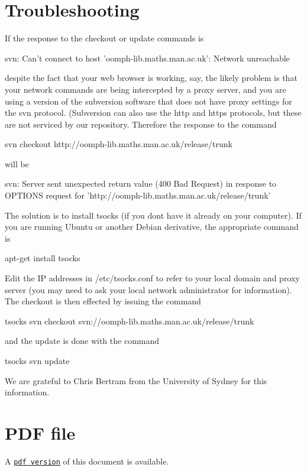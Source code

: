  \hypertarget{index_problems}{}\section{Troubleshooting}\label{index_problems}
If the response to the checkout or update commands is 
\begin{DoxyCode}
svn: Can\textcolor{stringliteral}{'t connect to host '}oomph-lib.maths.man.ac.uk\textcolor{stringliteral}{': Network unreachable}
\end{DoxyCode}
 despite the fact that your web browser is working, say, the likely problem is that your network commands are being intercepted by a proxy server, and you are using a version of the subversion software that does not have proxy settings for the svn protocol. (Subversion can also use the http and https protocols, but these are not serviced by our repository. Therefore the response to the command 
\begin{DoxyCode}
svn checkout http:\textcolor{comment}{//oomph-lib.maths.man.ac.uk/release/trunk }
\end{DoxyCode}
 will be 
\begin{DoxyCode}
svn: Server sent unexpected \textcolor{keywordflow}{return} value (400 Bad Request) in response to OPTIONS request
\textcolor{keywordflow}{for} \textcolor{stringliteral}{'http://oomph-lib.maths.man.ac.uk/release/trunk'}
\end{DoxyCode}


The solution is to install tsocks (if you don\textquotesingle{}t have it already on your computer). If you are running Ubuntu or another Debian derivative, the appropriate command is 
\begin{DoxyCode}
apt-\textcolor{keyword}{get} install tsocks
\end{DoxyCode}
 Edit the IP addresses in {\ttfamily /etc/tsocks}.conf to refer to your local domain and proxy server (you may need to ask your local network administrator for information). The checkout is then effected by issuing the command 
\begin{DoxyCode}
tsocks svn checkout svn:\textcolor{comment}{//oomph-lib.maths.man.ac.uk/release/trunk}
\end{DoxyCode}
 and the update is done with the command 
\begin{DoxyCode}
tsocks svn update
\end{DoxyCode}
 We are grateful to Chris Bertram from the University of Sydney for this information.



 

 \hypertarget{index_pdf}{}\section{P\+D\+F file}\label{index_pdf}
A \href{../latex/refman.pdf}{\tt pdf version} of this document is available. 
